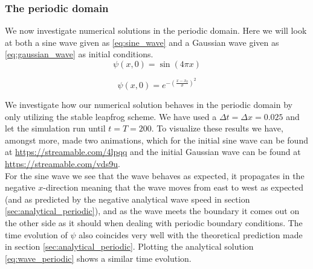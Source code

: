 \documentclass[12pt]{article}
\numberwithin{figure}{section}
\numberwithin{table}{section}
\begin{document}



\subsubsection{The periodic domain}

\noindent We now investigate numerical solutions in the periodic domain. Here we will look at both a sine wave given as \eqref{eq:sine_wave} and a Gaussian wave given as \eqref{eq:gaussian_wave} as initial conditions. \\  

\begin{equation}
		\psi(x,0) = \sin(4\pi x)
        \label{eq:sine_wave}
\end{equation}

\begin{equation}
		\psi(x,0) = e^{- (\frac{x - x_0}{\sigma})^2}
        \label{eq:gaussian_wave}
\end{equation}



\noindent We investigate how our numerical solution behaves in the periodic domain by only utilizing the stable leapfrog scheme. We have used a $\Delta t = \Delta x = 0.025$ and let the simulation run until $t=T=200$. To visualize these results we have, amongst more, made two animations, which for the initial sine wave can be found at \url{https://streamable.com/4lpqq} and the initial Gaussian wave can be found at \url{https://streamable.com/vds9u}. \\

\noindent For the sine wave we see that the wave behaves as expected, it propagates in the negative $x$-direction meaning that the wave moves from east to west as expected (and as predicted by the negative analytical wave speed in section \ref{sec:analytical_periodic}), and as the wave meets the boundary it comes out on the other side as it should when dealing with periodic boundary conditions. The time evolution of $\psi$ also coincides very well with the theoretical prediction made in section \ref{sec:analytical_periodic}. Plotting the analytical solution \eqref{eq:wave_periodic} shows a similar time evolution. \\
\end{document}

